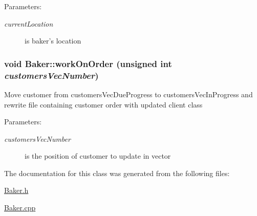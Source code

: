 \begin{Desc}
\item[Parameters:]
\begin{description}
\item[{\em current\-Location}]is baker's location \end{description}
\end{Desc}
\hypertarget{class_baker_9616413c80f3814907a9c2399ac50438}{
\subsubsection[workOnOrder]{\setlength{\rightskip}{0pt plus 5cm}void Baker::work\-On\-Order (unsigned int {\em customers\-Vec\-Number})}}
\label{class_baker_9616413c80f3814907a9c2399ac50438}


Move customer from customers\-Vec\-Due\-Progress to customers\-Vec\-In\-Progress and rewrite file containing customer order with updated client class

\begin{Desc}
\item[Parameters:]
\begin{description}
\item[{\em customers\-Vec\-Number}]is the position of customer to update in vector \end{description}
\end{Desc}


The documentation for this class was generated from the following files:\begin{CompactItemize}
\item 
\hyperlink{_baker_8h}{Baker.h}\item 
\hyperlink{_baker_8cpp}{Baker.cpp}\end{CompactItemize}
